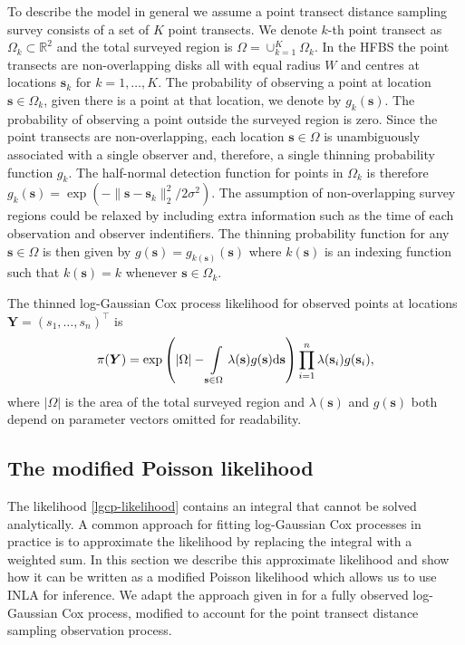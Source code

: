 \documentclass{statsoc}
\newcommand{\bs}{\mathbf{s}}
\newcommand{\bm}{\boldsymbol}  %
\begin{document}
To describe the model in general we assume a point transect distance sampling survey consists of a set of $K$ point transects.   We denote $k$-th point transect as $\Omega_k \subset \mathbb{R}^2$ and the total surveyed region is $\Omega = \cup_{k=1}^K \Omega_k$.  In the HFBS the point transects are non-overlapping disks all with equal radius $W$ and centres at locations $\bs_k$ for $k = 1, \ldots, K$.  The probability of observing a point at location $\bs \in \Omega_k$, given there is a point at that location, we denote by $g_k(\bs)$.  The probability of observing a point outside the surveyed region is zero.
Since the point transects are non-overlapping, each location $\bs \in \Omega$ is unambiguously associated with a single observer and, therefore, a single thinning probability function $g_k$.   The half-normal detection function for points in $\Omega_k$ is therefore $g_k(\bs) = \exp(-\lVert \bs - \bs_k \rVert_2^2 / 2\sigma^2)$.  The assumption of non-overlapping survey regions could be relaxed by including extra information such as the time of each observation and observer indentifiers.  The thinning probability function for any $\bs \in \Omega$ is then given by $g(\bs) = g_{k(\bs)}(\bs)$ where $k(\bs)$ is an indexing function such that $k(\bs) = k$ whenever $\bs \in \Omega_k$.

The thinned log-Gaussian Cox process likelihood for observed points at locations $\bm{Y} = (s_1, \ldots, s_n)^\intercal$ is
\begin{equation}
\label{lgcp-likelihood}
\pi(\bm{Y}) = \exp\left( |\Omega| -\int\displaylimits_{\bs \in \Omega} \lambda(\bs) g(\bs) \mathrm{d}\bs \right)\prod_{i=1}^n \lambda(\bs_i)g(\bs_i),
\end{equation}
where $|\Omega|$ is the area of the total surveyed region and $\lambda(\bs)$ and $g(\bs)$ both depend on parameter vectors omitted for readability.  

\subsection{The modified Poisson likelihood}
\label{sec-lgcp}

\sloppy The likelihood \eqref{lgcp-likelihood} contains an integral that cannot be solved analytically.  A common approach for fitting log-Gaussian Cox processes in practice is to approximate the likelihood by replacing the integral with a weighted sum.  In this section we describe this approximate likelihood and show how it can be written as a modified Poisson likelihood which allows us to use INLA for inference.  We adapt the approach given in \cite{simpson_going_2016} for a fully observed log-Gaussian Cox process, modified to account for the point transect distance sampling observation process.
\end{document}
